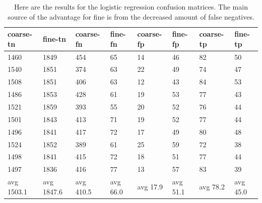\documentclass[ms]{nuthesis}
\begin{document}
\FloatBarrier
\begin{table}[h]
  \centering
  \begin{tabular}{|l||l||l||l||l||l||l||l|}\toprule
    coarse-tn & fine-tn & coarse-fn & fine-fn & coarse-fp & fine-fp & coarse-tp & fine-tp \\ \midrule
    1460 & 1849 & 454 & 65 & 14 & 46 & 82 & 50 \\
    1540 & 1851 & 374 & 63 & 22 & 49 & 74 & 47 \\
    1508 & 1851 & 406 & 63 & 12 & 43 & 84 & 53 \\
    1486 & 1853 & 428 & 61 & 19 & 53 & 77 & 43 \\
    1521 & 1859 & 393 & 55 & 20 & 52 & 76 & 44 \\
    1501 & 1843 & 413 & 71 & 19 & 52 & 77 & 44 \\
    1496 & 1841 & 417 & 72 & 17 & 49 & 80 & 48 \\
    1524 & 1852 & 389 & 61 & 25 & 59 & 72 & 38 \\
    1498 & 1841 & 415 & 72 & 18 & 51 & 77 & 44 \\
    1497 & 1836 & 416 & 77 & 13 & 57 & 83 & 39 \\
    avg 1503.1 & avg 1847.6 & avg 410.5 & avg 66.0 & avg 17.9 & avg 51.1 & avg 78.2 & avg 45.0 \\ \bottomrule
  \end{tabular}
  \caption{Here are the results for the logistic regression confusion matrices. The main source of the advantage
  for fine is from the decreased amount of false negatives.}
  \label{tab:logReg}
\end{table}
\FloatBarrier
\end{document}
